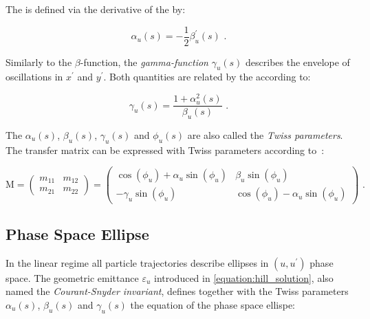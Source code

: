 The \alphafunction is defined via the derivative of the \betafunction by:

\begin{equation}
    \alpha_u(s) = - \frac{1}{2} \beta^{\prime}_u(s) \text{ .}
    \label{equation:alpha_function}
\end{equation}

Similarly to the \(\beta\)-function, the \emph{gamma-function} $\gamma_u(s)$ describes the envelope of oscillations in \(x^{\prime}\) and \(y^{\prime}\).
Both quantities are related by the \alphafunction according to:

\begin{equation}
    \gamma_u(s) = \frac{1 + \alpha_u^2(s)}{\beta_u(s)} \text{ .}
    \label{equation:gamma_function}
\end{equation}

The \(\alpha_u (s)\), \(\beta_u (s)\), \(\gamma_u (s)\) and \(\phi_u (s)\) are also called the \emph{Twiss parameters}.
The transfer matrix can be expressed with Twiss parameters according to~\cite{AOP:COURANT:Theory_Alternating_Gradient_Synchrotron}:

\begin{equation}
    \mathrm{M} = 
    \left( 
    \begin{array}{ll}
        m_{11} & m_{12} \\
        m_{21} & m_{22}
    \end{array} \right) 
    = 
    \left(
    \begin{array}{cc}
        \cos(\phi_u) + \alpha_u \sin(\phi_u) & \beta_u \sin(\phi_u) \\
        - \gamma_u \sin(\phi_u)              & \cos(\phi_u) - \alpha_u \sin(\phi_u)
    \end{array} 
    \right) \text{ .}
    \label{equation:transfer_matrix_twiss_parameters}
\end{equation}

\subsection{Phase Space Ellipse}

In the linear regime all particle trajectories describe ellipses in \((u, u^{\prime})\) phase space.
The geometric emittance \(\varepsilon_u\) introduced in \cref{equation:hill_solution}, also named the \emph{Courant-Snyder invariant}, defines together with the Twiss parameters \(\alpha_u (s)\), \(\beta_u (s)\) and \(\gamma_u (s)\) the equation of the phase space ellispe:

